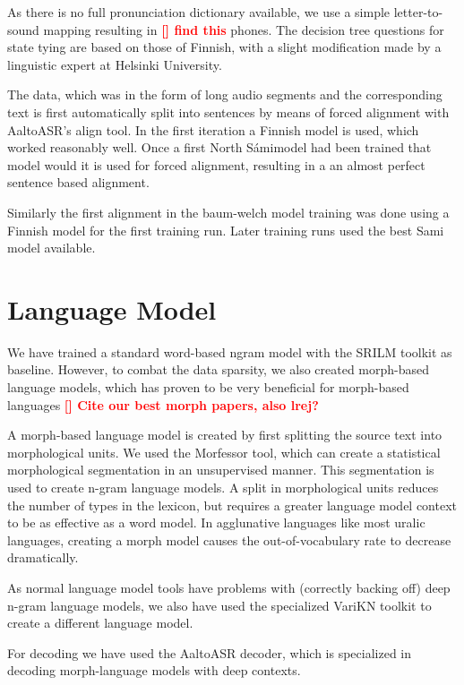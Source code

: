 \documentclass[b5paper]{article}
\newcommand{\todo}[2]{{\textcolor{red}{\bf [#1] #2 }}}
\newcommand{\ns}{{North Sámi}}
\begin{document}
As there is no full pronunciation dictionary available, we use a simple letter-to-sound mapping resulting in \todo{}{find this} phones. The decision tree questions for state tying are based on those of Finnish, with a slight modification made by a linguistic expert at Helsinki University.

The data, which was in the form of long audio segments and the corresponding text is first automatically split into sentences by means of forced alignment with AaltoASR's align tool. In the first iteration a Finnish model is used, which worked reasonably well. Once a first \ns model had been trained that model would it is used for forced alignment, resulting in a an almost perfect sentence based alignment.

Similarly the first alignment in the baum-welch model training was done using a Finnish model for the first training run. Later training runs used the best Sami model available.





\section{Language Model}
We have trained a standard word-based ngram model with the SRILM toolkit as baseline. However, to combat the data sparsity, we also created morph-based language models, which has proven to be very beneficial for morph-based languages \todo{}{Cite our best morph papers, also lrej?}

A morph-based language model is created by first splitting the source text into morphological units. We used the Morfessor tool, which can create a statistical morphological segmentation in an unsupervised manner. This segmentation is used to create n-gram language models. A split in morphological units reduces the number of types in the lexicon, but requires a greater language model context to be as effective as a word model. In agglunative languages like most uralic languages, creating a morph model causes the out-of-vocabulary rate to decrease dramatically.

As normal language model tools have problems with (correctly backing off) deep n-gram language models, we also have used the specialized VariKN toolkit to create a different language model.

For decoding we have used the AaltoASR decoder, which is specialized in decoding morph-language models with deep contexts.
\end{document}
